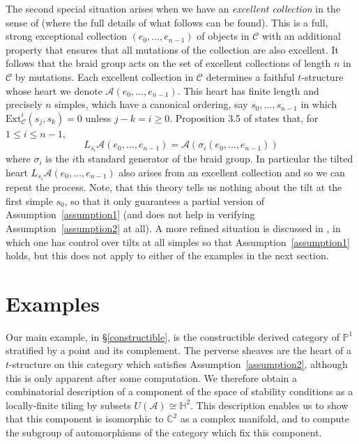\documentclass{article}
\theoremstyle{plain}
\theoremstyle{definition}
\theoremstyle{remark}
\newcommand{\defn}[1]{\emph{#1}}
\newcommand{\C}{\mathbb{C}}
\newcommand{\U}{\mathbb{H}}
\renewcommand{\P}{\mathbb{P}}
\newcommand{\cat}[1]{\mathcal{#1}}
\newcommand{\Ext}[4]{{\mathrm{Ext}_{#1}^{#2}}(#3,#4)}
\begin{document}
\label{excellent remarks}
The second special situation arises when we have an \defn{excellent collection} in the sense of \cite[\S 3]{MR2142382} (where the full details of what follows can be found). This is a full, strong exceptional collection $(e_0, \ldots, e_{n-1})$ of objects in $\cat{C}$ with an additional property that ensures that all mutations of the collection are also excellent. It follows that the braid group acts on the set of excellent collections of length $n$ in $\cat{C}$ by mutations. Each excellent collection in $\cat{C}$ determines a faithful $t$-structure whose heart we denote $\cat{A}(e_0, \ldots, e_{n-1})$. This heart has finite length and precisely $n$ simples, which have a canonical ordering, say $s_0,\ldots, s_{n-1}$ in which $\Ext{\cat{C}}{i}{s_j}{s_k}=0$ unless $j-k=i \geq 0$. Proposition 3.5 of \cite{MR2142382} states that, for $1\leq i \leq n-1$,
$$
L_{s_i}\cat{A}(e_0, \ldots, e_{n-1}) = \cat{A}\left(\sigma_i(e_0, \ldots, e_{n-1})\right)
$$
where $\sigma_i$ is the $i$th standard generator of the braid group. In particular the tilted heart $L_{s_i}\cat{A}(e_0, \ldots, e_{n-1})$ also arises from an excellent collection and so we can repeat the process.  Note, that this theory tells us nothing about the tilt at the first simple $s_0$, so that it only guarantees a partial version of Assumption~\ref{assumption1} (and does not help in verifying Assumption~\ref{assumption2} at all). A more refined situation is discussed in \cite[\S4]{MR2142382}, in which one has control over tilts at all simples so that Assumption~\ref{assumption1} holds, but this does not apply to either of the examples in the next section.

\section{Examples}
\label{examples}

Our main example, in \S\ref{constructible}, is the constructible derived category of $\P^1$ stratified by a point and its complement. The perverse sheaves are the heart of a $t$-structure on this category which satisfies Assumption~\ref{assumption2}, although this is only apparent after some computation. We therefore obtain a combinatorial description of a component of the space of stability conditions as a locally-finite tiling by subsets $U(\cat{A})\cong \U^2$. This description enables us to show that this component is isomorphic to $\C^2$ as a complex manifold, and to compute the subgroup of automorphisms of the category which fix this component.
\end{document}
